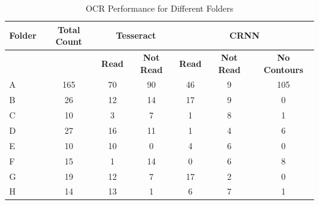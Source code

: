 \begin{table}[h]
    \centering
    \caption{OCR Performance for Different Folders}
    \label{tab:ocr_performance}
    \begin{tabular}{|l|c|c|c|c|c|c|}
        \hline
        \textbf{Folder} & \textbf{Total Count} & \multicolumn{2}{c|}{\textbf{Tesseract}} & \multicolumn{3}{c|}{\textbf{CRNN}}                                                            \\
        \hline
                        &                      & \textbf{Read}                           & \textbf{Not Read}                  & \textbf{Read} & \textbf{Not Read} & \textbf{No Contours} \\
        \hline
        A               & 165                  & 70                                      & 90                                 & 46            & 9                 & 105                  \\
        B               & 26                   & 12                                      & 14                                 & 17            & 9                 & 0                    \\
        C               & 10                   & 3                                       & 7                                  & 1             & 8                 & 1                    \\
        D               & 27                   & 16                                      & 11                                 & 1             & 4                 & 6                    \\
        E               & 10                   & 10                                      & 0                                  & 4             & 6                 & 0                    \\
        F               & 15                   & 1                                       & 14                                 & 0             & 6                 & 8                    \\
        G               & 19                   & 12                                      & 7                                  & 17            & 2                 & 0                    \\
        H               & 14                   & 13                                      & 1                                  & 6             & 7                 & 1                    \\
        \hline
    \end{tabular}
\end{table}
